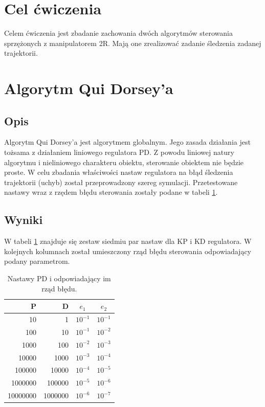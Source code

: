 \documentclass[12pt,a4paper]{article}
\begin{document}
\pdfpageheight   297mm
\pdfpagewidth    210mm

\StronaTytulowa
\SpisTresci

\pagebreak

\section{Cel ćwiczenia}
  Celem ćwiczenia jest zbadanie zachowania dwóch algorytmów sterowania sprzężonych z manipulatorem 2R. Mają one zrealizować zadanie śledzenia zadanej trajektorii.

\section{Algorytm Qui Dorsey'a}
  \subsection{Opis} %
    Algorytm Qui Dorsey'a jest algorytmem globalnym. Jego zasada działania jest tożsama z działaniem liniowego regulatora PD. Z powodu liniowej natury algorytmu i nieliniowego charakteru obiektu, sterowanie obiektem nie będzie proste. W celu zbadania właściwości nastaw regulatora na błąd śledzenia trajektorii (uchyb) został przeprowadzony szereg symulacji. Przetestowane nastawy wraz z rzędem błędu sterowania zostały podane w tabeli \ref{table:1}.

  \subsection{Wyniki} %
    W tabeli \ref{table:1} znajduje się zestaw siedmiu par nastaw dla KP i KD regulatora. W kolejnych kolumnach został umieszczony rząd błędu sterowania odpowiadający podany parametrom. 

  \begin{table}[h!]
    \centering
    \begin{tabular}{ r | r | c | c }
      P & D & $e_1$ & $e_2$  \\ 
      \hline
      10 & 1 & $10^{-1}$ & $10^{-1}$ \\  
      100 & 10 & $10^{-1}$ & $10^{-2}$ \\  
      1000 & 100 & $10^{-2}$ & $10^{-3}$ \\  
      10000 & 1000 & $10^{-3}$ & $10^{-4}$ \\  
      100000 & 10000 & $10^{-4}$ & $10^{-5}$ \\  
      1000000 & 100000 & $10^{-5}$ & $10^{-6}$ \\
      10000000 & 1000000 & $10^{-6}$ & $10^{-7}$
    \end{tabular}
    \caption{Nastawy PD i odpowiadający im rząd błędu.}
    \label{table:1}
  \end{table}
\end{document}

